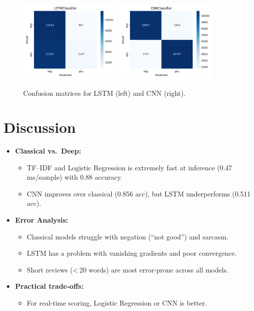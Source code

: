 \documentclass[12pt,a4paper]{article}
\begin{document}
\begin{figure}[H]
  \centering
  \includegraphics[width=0.45\textwidth]{figures/LSTMClassifier_confusion.png}
  \includegraphics[width=0.45\textwidth]{figures/CNNClassifier_confusion.png}
  \caption{Confusion matrices for LSTM (left) and CNN (right).}
  \label{fig:confusion_matrix_lstm_cnn}
\end{figure}

\section{Discussion}
\begin{itemize}
  \item \textbf{Classical vs.\ Deep:}  
    \begin{itemize}
      \item TF–IDF and Logistic Regression is extremely fast at inference (0.47 ms/sample) with 0.88 accuracy.
      \item CNN improves over classical (0.856 acc), but LSTM underperforms (0.511 acc).
    \end{itemize}
  \item \textbf{Error Analysis:}  
    \begin{itemize}
      \item Classical models struggle with negation (“not good”) and sarcasm.
      \item LSTM has a problem with vanishing gradients and poor convergence.
      \item Short reviews (< 20 words) are most error‐prone across all models.
    \end{itemize}
  \item \textbf{Practical trade‐offs:}  
    \begin{itemize}
      \item For real‐time scoring, Logistic Regression or CNN is better.
    \end{itemize}
\end{itemize}
\end{document}
